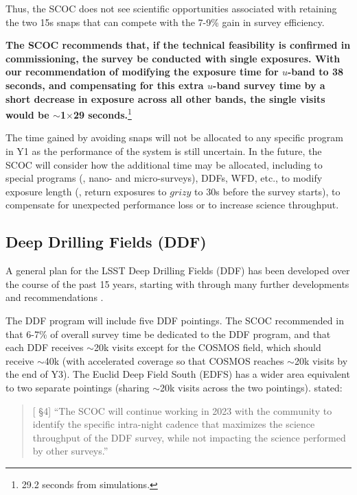 Thus, the SCOC does not see scientific opportunities associated with retaining the two 15s snaps that can compete with the 7-9\% gain in survey efficiency.

{\bf The SCOC recommends that, if the technical feasibility is confirmed in commissioning, the survey be conducted with single exposures. With our recommendation of modifying the exposure time for $u$-band to 38 seconds, and compensating for this extra $u$-band survey time by a short decrease in exposure across all other bands, the single visits would be \mbox{$\sim$1$\times$29} seconds.}\footnote{29.2 seconds from simulations.}

The time gained by avoiding snaps will not be allocated to any specific program in Y1 as the performance of the system is still uncertain. In the future, the SCOC will consider how the additional time may be allocated, including to special programs (\eg, nano- and micro-surveys), DDFs, WFD, etc., to modify exposure length (\eg, return exposures to $grizy$ to 30s before the survey starts), to compensate for unexpected performance loss or to increase science throughput.

\subsection{Deep Drilling Fields (DDF)}\label{sec:DDF}

A general plan for the LSST Deep Drilling Fields (DDF) has been developed over the course of the past 15 years, starting with \cite{2009arXiv0912.0201L} through many further developments and recommendations \citep[\eg ,][]{Brandt:2018,Scolnic:2018,Yu:2020,Kovacevic:2022,Czerny:2023,Zhang:2023,Gris:2023,Gris:2024,PozoNunez:2024}.

The DDF program will include
five DDF pointings. The SCOC recommended in  that  
6-7\% of overall survey time be dedicated to the DDF program, and that each DDF receives \mbox{$\sim$20k} visits
except for the COSMOS field, which should receive \mbox{$\sim$40k} (with accelerated coverage so that COSMOS reaches \mbox{$\sim$20k} visits by the end of Y3). The Euclid Deep Field South (EDFS) has a wider area equivalent to two separate pointings (sharing \mbox{$\sim$20k} visits across the two pointings).  stated: 
\begin{quote}
    {[ \S4] ``The SCOC will continue working in 2023 with the community to identify the specific intra-night cadence that maximizes the science throughput of the DDF survey, while not impacting the science performed by other surveys.''}
\end{quote}


